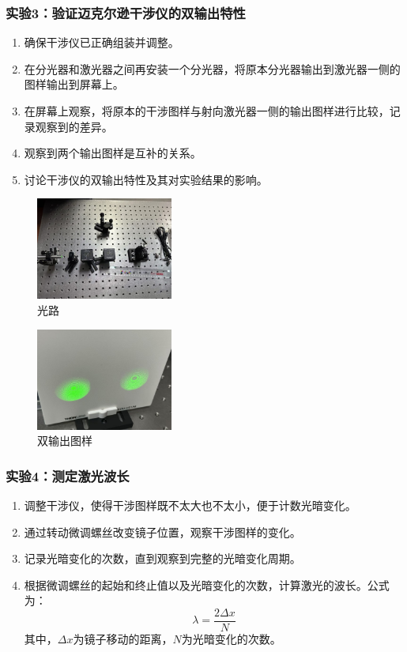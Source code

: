\documentclass{ctexart}
\begin{document}
\subsubsection{实验3：验证迈克尔逊干涉仪的双输出特性}
\begin{enumerate}
    \item 确保干涉仪已正确组装并调整。
    \item 在分光器和激光器之间再安装一个分光器，将原本分光器输出到激光器一侧的图样输出到屏幕上。
    \item 在屏幕上观察，将原本的干涉图样与射向激光器一侧的输出图样进行比较，记录观察到的差异。
    \item 观察到两个输出图样是互补的关系。
    \item 讨论干涉仪的双输出特性及其对实验结果的影响。
\end{enumerate}

\begin{figure}[H]
    \centering
    \includegraphics[width=0.4\textwidth]{pictures/微信图片_20241212155941.jpg}
    \caption{光路}
\end{figure}
\begin{figure}[H]
    \centering
    \includegraphics[width=0.4\textwidth]{pictures/微信图片_20241212155938.jpg}
    \caption{双输出图样}
\end{figure}
\subsubsection{实验4：测定激光波长}
\begin{enumerate}
    \item 调整干涉仪，使得干涉图样既不太大也不太小，便于计数光暗变化。
    \item 通过转动微调螺丝改变镜子位置，观察干涉图样的变化。
    \item 记录光暗变化的次数，直到观察到完整的光暗变化周期。
    \item 根据微调螺丝的起始和终止值以及光暗变化的次数，计算激光的波长。公式为：
    \[
    \lambda = \frac{2 \Delta x}{N}
    \]
    其中，\(\Delta x\)为镜子移动的距离，\(N\)为光暗变化的次数。
\end{enumerate}
\end{document}
